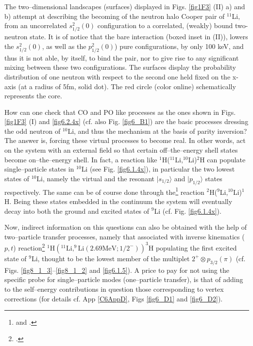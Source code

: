  The two--dimensional landscapes (surfaces) displayed in Figs. \ref{fig1F3} (II) a) and b) attempt at describing the becoming of the neutron halo     Cooper pair  of  $^{11}$Li,  from an uncorrelated $s_{1/2}^2(0)$  configuration to a  correlated, (weakly) bound two-neutron state. It is of notice that  the bare interaction (boxed inset in  (II)), lowers the $s_{1/2}^2(0)$, as well as the $p_{1/2}^2(0)$) pure  configurations,  by  only 100 keV, and thus it is not able, by itself,  to bind the pair, nor to give rise to any significant mixing between these two configurations. The surfaces display  the probability distribution of one neutron with respect to the second one held fixed on the x-axis (at a radius of 5fm, solid dot). The red circle (color online) schematically represents the core.

How can one check that CO and PO like processes as the ones shown in Figs. \ref{fig1F3} (I) and \ref{fig6.2.4x} (cf. also Fig. \ref{fig6_B1}) are the basic processes dressing the odd neutron of $^{10}$Li, and thus the mechanism at the basis of parity inversion? The answer is, forcing these virtual processes to become real. In other words, act on the system with an external field so that certain off--the--energy shell states become on--the--energy shell. In fact, a reaction like $^1$H($^{11}$Li,$^{10}$Li)$^2$H can populate single--particle states in $^{10}$Li (see Fig. \ref{fig6.1.4x}), in particular the two lowest states of $^{10}$Li, namely the virtual and the resonant $|s_{1/2}\rangle$ and $|p_{1/2}\rangle$ states respectively. The same can be of course done through the\footnote{\cite{Orrigo:09} and \cite{Jeppesen:04}.} reaction $^2$H($^9$Li,$^{10}$Li)$^1$H. Being these states embedded in the continuum the system will eventually decay into both the ground and excited states of $^9$Li (cf. Fig. \ref{fig6.1.4x}). 



Now,  indirect information on this questions can also be obtained	 with the help of two--particle transfer processes, namely that associated with inverse kinematics ($p,t$) reaction\footnote{\cite{Tanihata:08}.} $^1\text{H}(^{11}\text{Li},^{9}\text{Li}(2.69\text{MeV};1/2^-))^3$H populating the first excited state of $^9$Li, thought to be the lowest member of the multiplet $2^+\otimes p_{3/2}(\pi)$  (cf. Figs. \ref{fig8_1_3}--\ref{fig8_1_2} and \ref{fig6.1.5}).
 A price to pay for not using the specific probe for single--particle modes (one--particle transfer), is that of adding to the self--energy contributions in question those corresponding to vertex corrections (for details cf. App \ref{C6AppD}, Figs \ref{fig6_D1} and \ref{fig6_D2}). 

